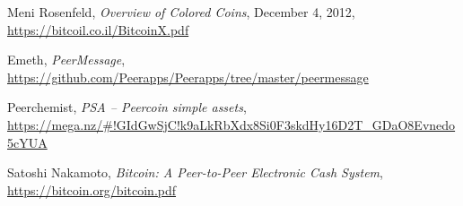 \documentclass[a4paper,10pt]{article}
\begin{document}
\begin{thebibliography}{9}

  Meni Rosenfeld,
  \emph{Overview of Colored Coins},
  December 4, 2012,
  \url{https://bitcoil.co.il/BitcoinX.pdf}

  Emeth,
  \emph{PeerMessage},
  \url{https://github.com/Peerapps/Peerapps/tree/master/peermessage}

  Peerchemist,
  \emph{PSA – Peercoin simple assets},
  \url{https://mega.nz/#!GIdGwSjC!k9aLkRbXdx8Si0F3skdHy16D2T_GDaO8Evnedo5cYUA}

  Satoshi Nakamoto,
  \emph{Bitcoin: A Peer-to-Peer Electronic Cash System},
  \url{https://bitcoin.org/bitcoin.pdf}

\end{thebibliography}
\end{document}
